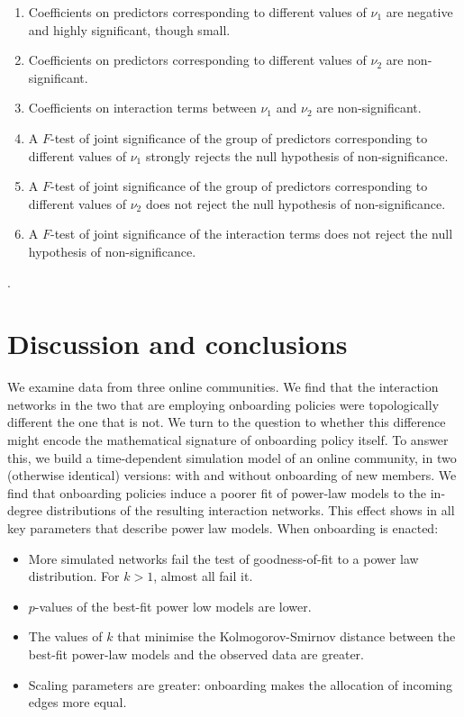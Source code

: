 \documentclass{bmcart}
\begin{document}
\begin{enumerate}
\item Coefficients on predictors corresponding to different values of $\nu_1$ are negative and highly significant, though small.
\item Coefficients on predictors corresponding to different values of $\nu_2$ are non-significant.
\item Coefficients on interaction terms between $\nu_1$ and $\nu_2$ are non-significant.
\item A $F$-test of joint significance of the group of predictors corresponding to different values of $\nu_1$ strongly rejects the null hypothesis of non-significance. 
\item A $F$-test of joint significance of the group of predictors corresponding to different values of $\nu_2$ does not reject the null hypothesis of non-significance.
\item A $F$-test of joint significance of the interaction terms does not reject the null hypothesis of non-significance.
\end{enumerate}.

\section{Discussion and conclusions} \label{sec:discussion_conclusions}

We examine data from three online communities. We find that the interaction networks in the two that are employing onboarding policies were topologically different the one that is not. We turn to the question to whether this difference might encode the mathematical signature of onboarding policy itself. To answer this, we build a time-dependent simulation model of an online community, in two (otherwise identical) versions: with and without onboarding of new members. We find that onboarding policies induce a poorer fit of power-law models to the in-degree distributions of the resulting interaction networks. This effect shows in all key parameters that describe power law models. When onboarding is enacted:

\begin {itemize}
\item More simulated networks fail the test of goodness-of-fit to a power law distribution. For $k > 1$, almost all fail it.
\item $p$-values of the best-fit power low models are lower. 
\item The values of $k$ that minimise the Kolmogorov-Smirnov distance between the best-fit power-law models and the observed data are greater. 
\item Scaling parameters are greater: onboarding makes the allocation of incoming edges more equal. 
\end{itemize}
\end{document}
